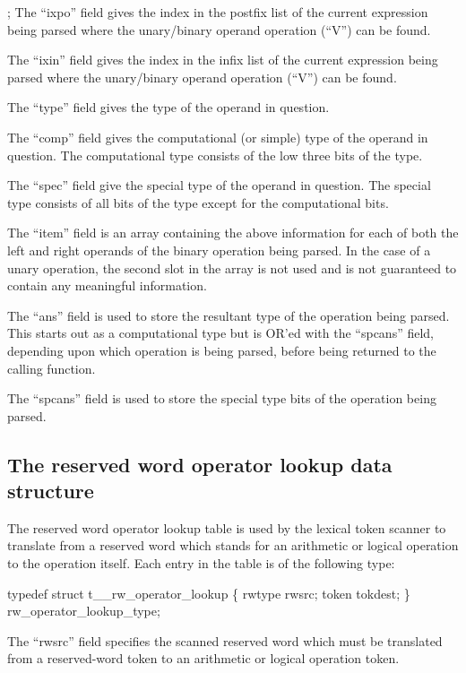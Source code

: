 ;
The ``ixpo'' field gives the index in the
postfix list of the
current expression being parsed
where the unary/binary operand operation (``V'') can be found.

The ``ixin'' field gives the index in the
infix list of the
current expression being parsed
where the unary/binary operand operation (``V'') can be found.

The ``type'' field gives the type of the operand in question.

The ``comp'' field gives the computational (or simple) type of the
operand in question.   The computational type consists of the low three bits of
the type.

The ``spec'' field give the special type of the operand in question.
The special type consists of all bits of the type except for the computational
bits.

The ``item'' field is an array containing the above information for each
of both the left and right operands of the binary operation being parsed.
In the case of a unary operation, the second slot in the array is not used
and is not guaranteed to contain any meaningful information.

The ``ans'' field is used to store the resultant type of the operation being
parsed.   This starts out as a computational type but is OR'ed with the
``spcans'' field, depending upon which operation is being parsed, before
being returned to the calling function.

The ``spcans'' field is used to store the special type bits of the operation
being parsed.

\subsection{The reserved word operator lookup data structure}
\label{sec:rwoplup}

The reserved word operator lookup table is used by the lexical token
scanner to translate from a reserved word which stands for an arithmetic
or logical operation to the operation itself.    Each entry in the table
is of the following type:
\begin{codeexample}
typedef struct t__rw_operator_lookup
   \{
      rwtype rwsrc;
      token tokdest;
   \} rw_operator_lookup_type;
\end{codeexample}


The ``rwsrc'' field specifies the scanned reserved word which must
be translated from a reserved-word token to an arithmetic or logical
operation token.

